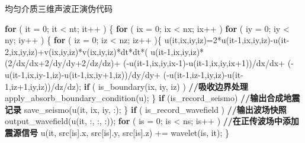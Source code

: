 \documentclass[degree=doctor]{thuthesis}
\begin{document}
\begin{algorithm}[ht]
\small
\caption{均匀介质三维声波正演伪代码}\label{alg:acousticfdcode}
\begin{algorithmic}[1]
\State \textbf{for} ( it = 0; it < nt; it++ ) \{ \label{ln:fdntbegin}
\State \quad\quad \textbf{for} ( ix = 0; ix < nx; ix++ )
\State \quad\quad\quad\quad \textbf{for} ( iy = 0; iy < ny; iy++ ) \{
\State \quad\quad\quad\quad\quad\quad \textbf{for} ( iz = 0; iz < nz; iz++ )\{
\State \quad\quad\quad\quad\quad\quad\quad\quad  u(it,ix,iy,iz)=2*u(it-1,ix,iy,iz)-u(it-2,ix,iy,iz)+v(ix,iy,iz)*v(ix,iy,iz)*dt*dt*(
\State \quad\quad\quad\quad\quad\quad\quad\quad\quad\quad\quad\quad\quad\quad\quad                                    u(it-1,ix,iy,iz)*(2/dx/dx+2/dy/dy+2/dz/dz)+
\State \quad\quad\quad\quad\quad\quad\quad\quad\quad\quad\quad\quad\quad\quad\quad                                    (-u(it-1,ix,iy,ix-1)-u(it-1,ix,iy,ix+1))/dx/dx+
\State \quad\quad \quad\quad\quad\quad\quad\quad\quad\quad\quad\quad\quad\quad\quad                                    (-u(it-1,ix,iy-1,iz)-u(it-1,ix,iy+1,iz))/dy/dy+
\State \quad\quad\quad\quad\quad\quad\quad\quad\quad\quad\quad\quad\quad\quad\quad                                    (-u(it-1,iz-1,iy,iz)-u(it-1,iz+1,iy,iz))/dz/dz);
\State
\State \quad\quad\quad\quad\quad\quad\quad\quad \textbf{if} ( is\_boundary(ix, iy, iz) ) \textbf{//吸收边界处理} \label{ln:fdboundary}
\State \quad\quad\quad\quad\quad\quad\quad\quad\quad\quad\quad    apply\_absorb\_boundary\_condition(u);
\State \quad\quad\quad\quad\quad\quad                \} \label{ln:fdntend}
\State \quad\quad\quad\quad\quad\quad \textbf{if} (is\_record\_seismo) \textbf{//输出合成地震记录}
\State \quad\quad\quad\quad\quad\quad\quad\quad save\_seismo(u(it, ix, iy, :);
\State \quad\quad\quad\quad \}
\State
\State \quad\quad \textbf{if} ( is\_record\_wavefield ) \textbf{//输出波场快照}
\State \quad\quad\quad\quad output\_wavefield(u(it, :, :, :));
\State
\State \quad\quad \textbf{for} ( is = 0; is < ns; is++ ) \textbf{//在正传波场中添加震源信号}
\State \quad\quad\quad\quad u(it, src[is].x, src[is].y, src[is].z) += wavelet(is, it);
\State \}
\end{algorithmic}
\end{algorithm}
\end{document}
